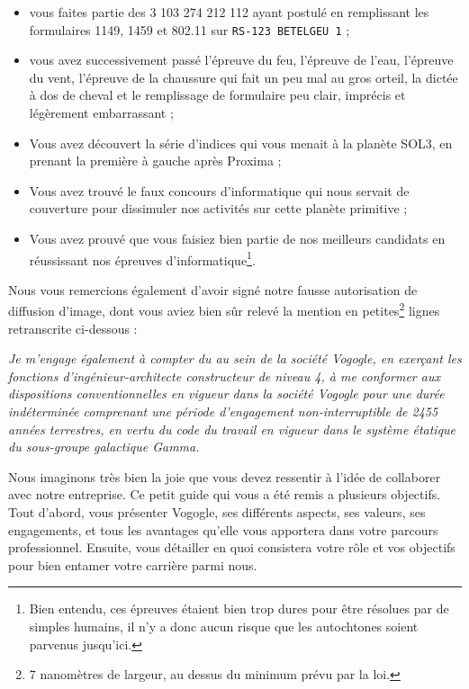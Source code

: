 \begin{itemize}
    \item vous faites partie des 3 103 274 212 112 ayant postulé en remplissant
        les formulaires 1149, 1459 et 802.11 sur \texttt{RS-123 BETELGEU~1} ;
    \item vous avez successivement passé l'épreuve du feu, l'épreuve de l'eau,
        l'épreuve du vent, l'épreuve de la chaussure qui fait un peu mal au
        gros orteil, la dictée à dos de cheval et le remplissage de formulaire
        peu clair, imprécis et légèrement embarrassant ;
    \item Vous avez découvert la série d'indices qui vous menait à la planète
        SOL3, en prenant la première à gauche après Proxima ;
    \item Vous avez trouvé le faux concours d'informatique qui nous servait de
        couverture pour dissimuler nos activités sur cette planète primitive ;
    \item Vous avez prouvé que vous faisiez bien partie de nos meilleurs
        candidats en réussissant nos épreuves d'informatique\footnote{Bien
        entendu, ces épreuves étaient bien trop dures pour être résolues par de
        simples humains, il n'y a donc aucun risque que les autochtones soient
        parvenus jusqu'ici.}.
\end{itemize}

Nous vous remercions également d'avoir signé notre fausse autorisation de
diffusion d'image, dont vous aviez bien sûr relevé la mention en
petites\footnote{7 nanomètres de largeur, au dessus du minimum prévu par la
loi.} lignes retranscrite ci-dessous :

\emph{Je m'engage également à compter du au sein de la société Vogogle, en
exerçant les fonctions d'ingénieur-architecte constructeur de niveau 4, à me
conformer aux dispositions conventionnelles en vigueur dans la société Vogogle
pour une durée indéterminée comprenant une période d'engagement
non-interruptible de 2455 années terrestres, en vertu du code du travail en
vigueur dans le système étatique du sous-groupe galactique Gamma.}

Nous imaginons très bien la joie que vous devez ressentir à l'idée de
collaborer avec notre entreprise. Ce petit guide qui vous a été remis a
plusieurs objectifs. Tout d'abord, vous présenter Vogogle, ses différents
aspects, ses valeurs, ses engagements, et tous les avantages qu'elle vous
apportera dans votre parcours professionnel. Ensuite, vous détailler en quoi
consistera votre rôle et vos objectifs pour bien entamer votre carrière parmi
nous.

